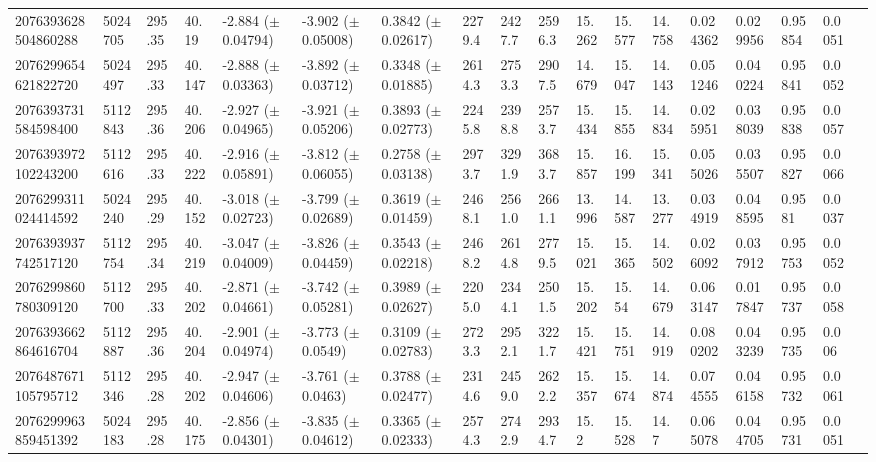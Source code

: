 \begin{sidewaystable}[htbp]
{\begin{tabular}{llllllllllllllllll}
            2076393628504860288 & 5024705 & 295.35 & 40.19 & -2.884 ($\pm$ 0.04794) & -3.902 ($\pm$ 0.05008) & 0.3842 ($\pm$ 0.02617) & 2279.4 & 2427.7 & 2596.3 & 15.262 & 15.577 & 14.758 & 0.024362 & 0.029956 & 0.95854 & 0.0051 & \\
            2076299654621822720 & 5024497 & 295.33 & 40.147 & -2.888 ($\pm$ 0.03363) & -3.892 ($\pm$ 0.03712) & 0.3348 ($\pm$ 0.01885) & 2614.3 & 2753.3 & 2907.5 & 14.679 & 15.047 & 14.143 & 0.051246 & 0.040224 & 0.95841 & 0.0052 & \\
            2076393731584598400 & 5112843 & 295.36 & 40.206 & -2.927 ($\pm$ 0.04965) & -3.921 ($\pm$ 0.05206) & 0.3893 ($\pm$ 0.02773) & 2245.8 & 2398.8 & 2573.7 & 15.434 & 15.855 & 14.834 & 0.025951 & 0.038039 & 0.95838 & 0.0057 & \\
            2076393972102243200 & 5112616 & 295.33 & 40.222 & -2.916 ($\pm$ 0.05891) & -3.812 ($\pm$ 0.06055) & 0.2758 ($\pm$ 0.03138) & 2973.7 & 3291.9 & 3683.7 & 15.857 & 16.199 & 15.341 & 0.055026 & 0.035507 & 0.95827 & 0.0066 & \\
            2076299311024414592 & 5024240 & 295.29 & 40.152 & -3.018 ($\pm$ 0.02723) & -3.799 ($\pm$ 0.02689) & 0.3619 ($\pm$ 0.01459) & 2468.1 & 2561.0 & 2661.1 & 13.996 & 14.587 & 13.277 & 0.034919 & 0.048595 & 0.9581 & 0.0037 & \\
            2076393937742517120 & 5112754 & 295.34 & 40.219 & -3.047 ($\pm$ 0.04009) & -3.826 ($\pm$ 0.04459) & 0.3543 ($\pm$ 0.02218) & 2468.2 & 2614.8 & 2779.5 & 15.021 & 15.365 & 14.502 & 0.026092 & 0.037912 & 0.95753 & 0.0052 & \\
            2076299860780309120 & 5112700 & 295.33 & 40.202 & -2.871 ($\pm$ 0.04661) & -3.742 ($\pm$ 0.05281) & 0.3989 ($\pm$ 0.02627) & 2205.0 & 2344.1 & 2501.5 & 15.202 & 15.54 & 14.679 & 0.063147 & 0.017847 & 0.95737 & 0.0058 & \\
            2076393662864616704 & 5112887 & 295.36 & 40.204 & -2.901 ($\pm$ 0.04974) & -3.773 ($\pm$ 0.0549) & 0.3109 ($\pm$ 0.02783) & 2723.3 & 2952.1 & 3221.7 & 15.421 & 15.751 & 14.919 & 0.080202 & 0.043239 & 0.95735 & 0.006 & \\
            2076487671105795712 & 5112346 & 295.28 & 40.202 & -2.947 ($\pm$ 0.04606) & -3.761 ($\pm$ 0.0463) & 0.3788 ($\pm$ 0.02477) & 2314.6 & 2459.0 & 2622.2 & 15.357 & 15.674 & 14.874 & 0.074555 & 0.046158 & 0.95732 & 0.0061 & \\
            2076299963859451392 & 5024183 & 295.28 & 40.175 & -2.856 ($\pm$ 0.04301) & -3.835 ($\pm$ 0.04612) & 0.3365 ($\pm$ 0.02333) & 2574.3 & 2742.9 & 2934.7 & 15.2 & 15.528 & 14.7 & 0.065078 & 0.044705 & 0.95731 & 0.0051 & \\

\end{tabular}}
\end{sidewaystable}
